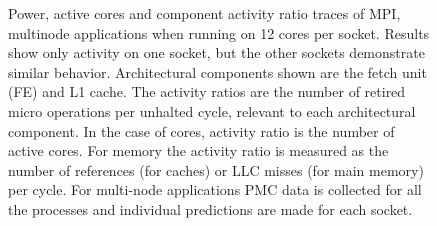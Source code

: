 \begin{figure}[!ht]
	\caption{Power, active cores and component activity ratio traces of MPI, multinode applications when running on 12 cores per socket.  Results show only activity on one socket, but the other sockets demonstrate similar behavior.
Architectural components shown are the fetch unit (FE) and L1
cache.  The activity ratios are the number of retired micro operations per unhalted cycle,
relevant to each architectural component.  In the case of cores, activity ratio is the
number of active cores.  For memory the activity ratio is measured as the number of
references (for caches) or LLC misses (for main memory) per cycle.  For multi-node
applications  PMC data is collected for all the processes and individual predictions 
are made for each socket.}
	\label{fig:component_activity_ratios_2}
\end{figure}



